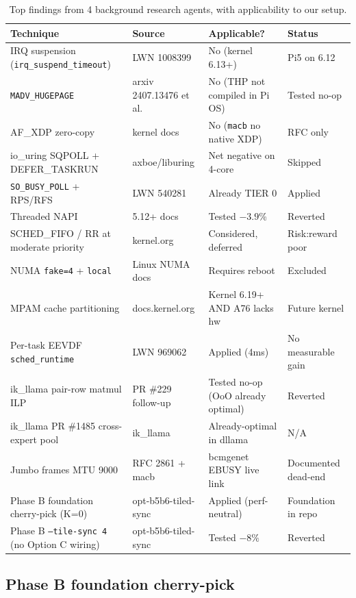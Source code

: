 \documentclass[10pt,a4paper]{article}
\begin{document}
\begin{table}[H]
\centering
\caption{Top findings from 4 background research agents, with applicability to our setup.}
\footnotesize
\begin{tabular}{p{4cm}p{2cm}p{3cm}p{3cm}}
\toprule
\textbf{Technique} & \textbf{Source} & \textbf{Applicable?} & \textbf{Status} \\
\midrule
IRQ suspension (\texttt{irq\_suspend\_timeout}) & LWN 1008399 & No (kernel 6.13+) & Pi5 on 6.12 \\
\texttt{MADV\_HUGEPAGE} & arxiv 2407.13476 et al. & No (THP not compiled in Pi OS) & Tested no-op \\
AF\_XDP zero-copy & kernel docs & No (\texttt{macb} no native XDP) & RFC only \\
io\_uring SQPOLL + DEFER\_TASKRUN & axboe/liburing & Net negative on 4-core & Skipped \\
\texttt{SO\_BUSY\_POLL} + RPS/RFS & LWN 540281 & Already TIER 0 & Applied \\
Threaded NAPI & 5.12+ docs & Tested $-3.9$\% & Reverted \\
SCHED\_FIFO / RR at moderate priority & kernel.org & Considered, deferred & Risk:reward poor \\
NUMA \texttt{fake=4} + \texttt{local} & Linux NUMA docs & Requires reboot & Excluded \\
MPAM cache partitioning & docs.kernel.org & Kernel 6.19+ AND A76 lacks hw & Future kernel \\
Per-task EEVDF \texttt{sched\_runtime} & LWN 969062 & Applied (4ms) & No measurable gain \\
ik\_llama pair-row matmul ILP & PR \#229 follow-up & Tested no-op (OoO already optimal) & Reverted \\
ik\_llama PR \#1485 cross-expert pool & ik\_llama & Already-optimal in dllama & N/A \\
Jumbo frames MTU 9000 & RFC 2861 + macb & bcmgenet EBUSY live link & Documented dead-end \\
Phase B foundation cherry-pick (K=0) & opt-b5b6-tiled-sync & Applied (perf-neutral) & Foundation in repo \\
Phase B \texttt{--tile-sync 4} (no Option C wiring) & opt-b5b6-tiled-sync & Tested $-8\%$ & Reverted \\
\bottomrule
\end{tabular}
\end{table}

\subsection{Phase B foundation cherry-pick}
\end{document}
